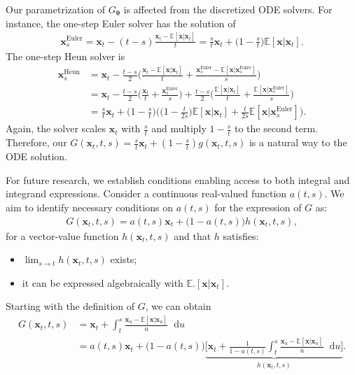 \documentclass{article} \usepackage{iclr2024_coNFErence,times}
\newcommand{\djk}[1]{{\color{black}{{#1}}}}
\theoremstyle{definition}
\theoremstyle{remark}
\newcommand*\diff{\mathop{}\!\mathrm{d}}
\begin{document}
Our parametrization of $G_{\bm{\theta}}$ is affected from the discretized ODE solvers. For instance, the one-step Euler solver has the solution of
\begin{align*}
    \mathbf{x}_{s}^{\text{Euler}}=\mathbf{x}_{t}-(t-s)\frac{\mathbf{x}_{t}-\mathbb{E}[\mathbf{x}\vert\mathbf{x}_{t}]}{t}=\frac{s}{t}\mathbf{x}_{t}+\bigg(1-\frac{s}{t}\bigg)\mathbb{E}[\mathbf{x}\vert\mathbf{x}_{t}].
\end{align*}
The one-step Heun solver is
\begin{align*}
    \mathbf{x}_{s}^{\text{Heun}}&=\mathbf{x}_{t}-\frac{t-s}{2}\bigg( 
\frac{\mathbf{x}_{t}-\mathbb{E}[\mathbf{x}\vert\mathbf{x}_{t}]}{t} + \frac{\mathbf{x}_{s}^{\text{Euler}}-\mathbb{E}[\mathbf{x}\vert\mathbf{x}_{s}^{\text{Euler}}]}{s} \bigg)\\
&=\mathbf{x}_{t}-\frac{t-s}{2}\bigg(\frac{\mathbf{x}_{t}}{t}+\frac{\mathbf{x}_{s}^{\text{Euler}}}{s}\bigg)+\frac{t-s}{2}\bigg(\frac{\mathbb{E}[\mathbf{x}\vert\mathbf{x}_{t}]}{t}+\frac{\mathbb{E}[\mathbf{x}\vert\mathbf{x}_{s}^{\text{Euler}}]}{s}\bigg)\\
&=\frac{s}{t}\mathbf{x}_{t}+\bigg(1-\frac{s}{t}\bigg)\bigg(\Big(1-\frac{t}{2s}\Big)\mathbb{E}[\mathbf{x}\vert\mathbf{x}_{t}]+\frac{t}{2s}\mathbb{E}[\mathbf{x}\vert\mathbf{x}_{s}^{\text{Euler}}]\bigg).
\end{align*}
Again, the solver scales $\mathbf{x}_{t}$ with $\frac{s}{t}$ and multiply $1-\frac{s}{t}$ to the second term. Therefore, our $G(\mathbf{x}_{t},t,s)=\frac{s}{t}\mathbf{x}_{t}+(1-\frac{s}{t})g(\mathbf{x}_{t},t,s)$ is a natural way to \djk{represent} the ODE solution.

For future research, we establish conditions enabling access to both integral and integrand expressions. Consider a continuous real-valued function $a(t, s)$. We aim to identify necessary conditions on $a(t, s)$ for the expression of $G$ as:
\begin{align*}
    G(\mathbf{x}_{t},t,s) = a(t,s)\mathbf{x}_t + \big(1-a(t,s)\big)h(\mathbf{x}_t, t, s),
\end{align*}
for a vector-value function $h(\mathbf{x}_t, t, s)$ and that $h$ satisfies:
\begin{itemize}
    \item $\lim_{s\rightarrow t }h(\mathbf{x}_t, t, s)$ exists;
    \item it can be expressed algebraically with $\mathbb{E}.[\mathbf{x}\vert\mathbf{x}_{t}]$.
\end{itemize}
Starting with the definition of $G$, we can obtain
\begin{align*}
G(\mathbf{x}_{t},t,s)&=\mathbf{x}_{t}+\int_{t}^{s}\frac{\mathbf{x}_{u}-\mathbb{E}[\mathbf{x}\vert\mathbf{x}_{u}]}{u}\diff u
\\&=a(t,s)\mathbf{x}_t + \big(1-a(t,s)\big)\underset{h(\mathbf{x}_t , t, s)}{\underbrace{\Big[\mathbf{x}_t + \frac{1}{1-a(t,s)} \int_{t}^{s}\frac{\mathbf{x}_{u}-\mathbb{E}[\mathbf{x}\vert\mathbf{x}_{u}]}{u}\diff u\Big]}}.
\end{align*}
\end{document}
